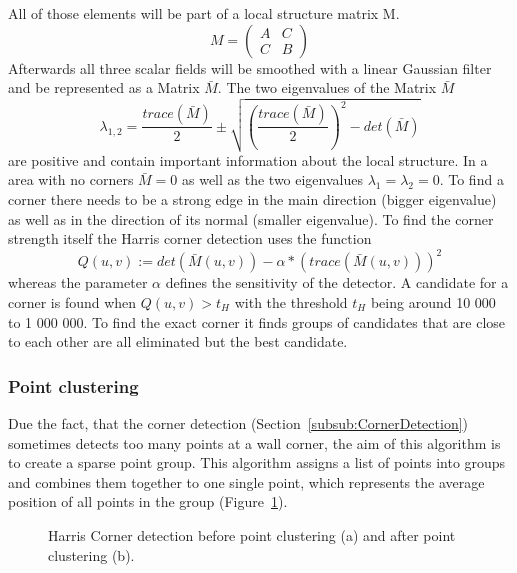 All of those elements will be part of a local structure matrix M.
\begin{equation}M = \begin{pmatrix} A & C \\ C & B \end{pmatrix}\end{equation}
Afterwards all three scalar fields will be smoothed with a linear Gaussian filter and be represented as a Matrix $\bar{M}$.
The two eigenvalues of the Matrix $\bar{M}$
\begin{equation}\lambda_{1,2} = \dfrac{trace(\bar{M})}{2} \pm \sqrt{(\dfrac{trace(\bar{M})}{2})^2 - det(\bar{M})} \end{equation}
are positive and contain important information about the local structure. In a area with no corners $\bar{M} = 0$  as well as the two eigenvalues $\lambda_1 = \lambda_2 = 0$. To find a corner there needs to be a strong edge in the main direction (bigger eigenvalue) as well as in the direction of its normal (smaller eigenvalue). 
To find the corner strength itself the Harris corner detection uses the function 
\begin{equation}Q(u,v) := det(\bar{M}(u,v)) - \alpha * (trace(\bar{M}(u,v)))^2\end{equation}
whereas the parameter $\alpha$ defines the sensitivity of the detector. A candidate for a corner is found when
$Q(u,v) > t_H$
with the threshold $t_{H}$ being around 10 000 to 1 000 000. To find the exact corner it finds groups of candidates that are close to each other are all eliminated but the best candidate.

\subsubsection{Point clustering}
\label{sec:PointClustering}
Due the fact, that the corner detection (Section~\ref{subsub:CornerDetection}) sometimes detects too many points at a wall corner, the aim of this algorithm is to create a sparse point group. This algorithm assigns a list of points into groups and combines them together to one single point, which represents the average position of all points in the group (Figure~\ref{fig:HCPointClustering}).

\begin{figure}[h!]
	\centering
	\hfill
	\caption{Harris Corner detection before point clustering (a) and after point clustering (b).}
	\label{fig:HCPointClustering}
\end{figure}

